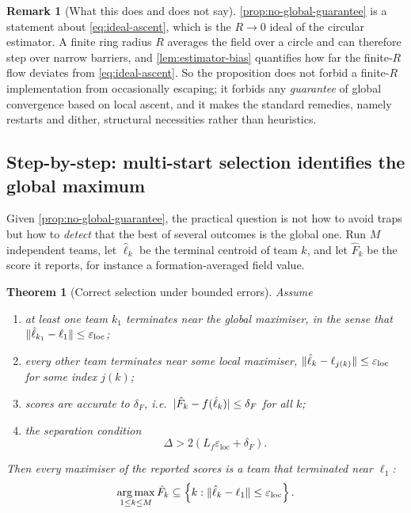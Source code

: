 \documentclass[11pt,a4paper]{article}
\theoremstyle{plain}
\newtheorem{theorem}{Theorem}
\theoremstyle{definition}
\newtheorem{remark}{Remark}
\DeclareMathOperator*{\argmax}{arg\,max}
\DeclarePairedDelimiter{\norm}{\lVert}{\rVert}
\DeclarePairedDelimiter{\abs}{\lvert}{\rvert}
\newcommand{\NotationContext}[1]{\markboth{#1}{#1}}
\begin{document}
\begin{remark}[What this does and does not say]\label{rem:trapping-scope}
\cref{prop:no-global-guarantee} is a statement about \eqref{eq:ideal-ascent}, which is the
$R\to0$ ideal of the circular estimator. A finite ring radius $R$ averages the field over a
circle and can therefore step over narrow barriers, and \cref{lem:estimator-bias} quantifies how
far the finite-$R$ flow deviates from \eqref{eq:ideal-ascent}. So the proposition does not forbid
a finite-$R$ implementation from occasionally escaping; it forbids any \emph{guarantee} of global
convergence based on local ascent, and it makes the standard remedies, namely restarts and
dither, structural necessities rather than heuristics.
\end{remark}

\subsection{Step-by-step: multi-start selection identifies the global maximum}\label{sec:gap3-multistart}
\NotationContext{multistart}

Given \cref{prop:no-global-guarantee}, the practical question is not how to avoid traps but how
to \emph{detect} that the best of several outcomes is the global one. Run $M$ independent teams,
let $\hat\ell_k$ be the terminal centroid of team $k$, and let $\hat F_k$ be the score it
reports, for instance a formation-averaged field value.

\begin{theorem}[Correct selection under bounded errors]\label{thm:multistart}
Assume
\begin{enumerate}[label=(\alph*),nosep]
    \item at least one team $k_1$ terminates near the global maximiser, in the sense that
    $\norm{\hat\ell_{k_1}-\ell_1}\leq\varepsilon_{\mathrm{loc}}$;
    \item every other team terminates near \emph{some} local maximiser,
    $\norm{\hat\ell_k-\ell_{j(k)}}\leq\varepsilon_{\mathrm{loc}}$ for some index $j(k)$;
    \item scores are accurate to $\delta_F$, i.e.\ $\abs{\hat F_k-f(\hat\ell_k)}\leq\delta_F$ for
    all $k$;
    \item the separation condition
    \begin{equation}\label{eq:multistart-condition}
        \Delta>2\left(L_f\varepsilon_{\mathrm{loc}}+\delta_F\right).
    \end{equation}
\end{enumerate}
Then every maximiser of the reported scores is a team that terminated near $\ell_1$:
\begin{equation}\label{eq:multistart-selection}
    \argmax_{1\leq k\leq M}\hat F_k
    \subseteq\left\{k:\norm{\hat\ell_k-\ell_1}\leq\varepsilon_{\mathrm{loc}}\right\}.
\end{equation}
\end{theorem}
\end{document}
